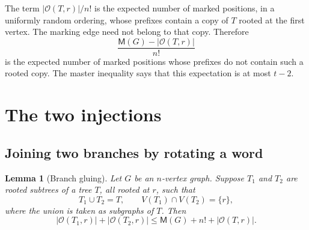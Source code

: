 \documentclass[11pt]{article}
\numberwithin{equation}{section}
\newtheorem{lemma}[theorem]{Lemma}
\theoremstyle{definition}
\newcommand{\cO}{\mathcal O}
\newcommand{\Mcnt}{\mathsf M}
\begin{document}
The term $|\cO(T,r)|/n!$ is the expected number of marked positions, in a
uniformly random ordering, whose prefixes contain a copy of $T$ rooted at
the first vertex.  The marking edge need not belong to that copy.  Therefore
\[
        \frac{\Mcnt(G)-|\cO(T,r)|}{n!}
\]
is the expected number of marked positions whose prefixes do not contain
such a rooted copy.  The master inequality says that this expectation is at
most $t-2$.

\section{The two injections}\label{sec:injections}

\subsection{Joining two branches by rotating a word}

\begin{lemma}[Branch gluing]\label{lem:branch}
Let $G$ be an $n$-vertex graph.  Suppose $T_1$ and $T_2$ are rooted
subtrees of a tree $T$, all rooted at $r$, such that
\[
 T_1\cup T_2=T,\qquad V(T_1)\cap V(T_2)=\{r\},
\]
where the union is taken as subgraphs of $T$.  Then
\[
 |\cO(T_1,r)|+|\cO(T_2,r)|
 \leq \Mcnt(G)+n!+|\cO(T,r)|.
\]
\end{lemma}
\end{document}
